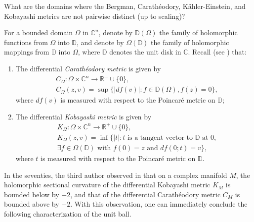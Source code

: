 \documentclass[12pt] {article}
\numberwithin{equation}{section}
\begin{document}
  
       
 

     \medskip

 

 What are the domains where the Bergman, Carath\'eodory, K\"ahler-Einstein, and Kobayashi metrics are not pairwise distinct (up to scaling)?
 
 
   

   \medskip

For a bounded domain $\Omega$ in $\mathbb{C}^n$, denote by $\mathbb{D}(\Omega)$ the family of holomorphic functions from $\Omega$ into $\mathbb{D}$, and denote by $\Omega(\mathbb{D})$ the family of holomorphic mappings from $\mathbb{D}$ into $\Omega$, where $\mathbb{D}$ denotes the unit disk in $\mathbb{C}$. Recall (see \cite{Wo}) that:

\begin{enumerate}
\item [$1.$] The differential {\it Carath\'eodory metric} is given by
\begin{equation*}
\begin{split}
&C_{\Omega}: \Omega \times \mathbb{C}^n \to \mathbb{R}^+ \cup \{0\},\\
&C_{\Omega}(z, v) = \sup\{ |df(v)| : f \in \mathbb{D}(\Omega), f(z) = 0\},
\end{split}
\end{equation*}
where $df(v)$ is measured with respect to the Poincar\'e metric on $\mathbb{D}$;

\item [$2.$] The differential {\it Kobayashi metric} is given by
\begin{equation*}
\begin{split}
&K_{\Omega}: \Omega \times \mathbb{C}^n \to \mathbb{R}^+ \cup \{0\},\\
&K_{\Omega}(z, v) = \inf\{ |t| : t \text{ is a tangent vector to } \mathbb{D} \text{ at } 0,\\
&\exists f \in \Omega(\mathbb{D}) \text{ with } f(0) = z \text{ and } df(0;t) = v\},
\end{split}
\end{equation*}
where $t$ is measured with respect to the Poincar\'e metric on $\mathbb{D}$.


\end{enumerate}

In the seventies, the third author observed in \cite{W} that on a complex manifold \(M\), the holomorphic sectional curvature of the differential Kobayashi metric \(K_M\) is bounded below by \(-2\), and that of the differential Carath\'eodory metric \(C_M\) is bounded above by \(-2\). With this observation, one can immediately conclude the following characterization of the unit ball.
\end{document}
